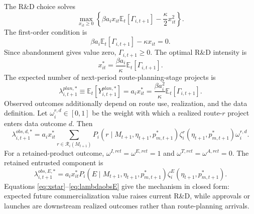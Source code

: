 \documentclass[12pt]{article}
\newcommand{\E}{\mathbb{E}}
\newcommand{\1}{\mathbf{1}}
\newcommand{\calR}{\mathcal{R}}
\begin{document}
The R\&D choice solves
\begin{equation}
\max_{x_{it}\ge0}\left\{
\beta a_i x_{it}\E_t[\Gamma_{i,t+1}]
-\frac{\kappa}{2}x_{it}^2
\right\}.
\label{eq:xproblem}
\end{equation}
The first-order condition is
\begin{equation}
    \beta a_i\E_t[\Gamma_{i,t+1}]-\kappa x_{it}=0.
    \label{eq:foc}
\end{equation}
Since abandonment gives value zero, $\Gamma_{i,t+1}\ge0$. The optimal R\&D intensity is
\begin{equation}
    x^*_{it}=\frac{\beta a_i}{\kappa}\E_t[\Gamma_{i,t+1}].
    \label{eq:xstar}
\end{equation}
The expected number of next-period route-planning-stage projects is
\begin{equation}
    \lambda^{plan,*}_{i,t+1}\equiv \E_t[Y^{plan,*}_{i,t+1}]
    =a_i x^*_{it}
    =\frac{\beta a_i^2}{\kappa}\E_t[\Gamma_{i,t+1}].
    \label{eq:lambdastar}
\end{equation}
Observed outcomes additionally depend on route use, realization, and the data definition. Let $\omega_i^{r,d}\in[0,1]$ be the weight with which a realized route-$r$ project enters data outcome $d$. Then
\begin{equation}
    \lambda^{obs,d,*}_{i,t+1}
    =
    a_i x^*_{it}
    \sum_{r\in\calR_i(M_{t+1})}
    P_i(r\mid M_{t+1},\eta_{t+1},p^*_{m,t+1})
    \zeta_i^r(\eta_{t+1},p^*_{m,t+1})\omega_i^{r,d}.
    \label{eq:lambdaobs}
\end{equation}
For a retained-product outcome, $\omega^{I,ret}=\omega^{E,ret}=1$ and $\omega^{T,ret}=\omega^{A,ret}=0$. The retained entrusted component is
\begin{equation}
    \lambda^{obs,E,*}_{i,t+1}
    =
    a_i x^*_{it}
    P_i(E\mid M_{t+1},\eta_{t+1},p^*_{m,t+1})
    \zeta_i^E(\eta_{t+1},p^*_{m,t+1}).
    \label{eq:lambdaobsE}
\end{equation}
Equations \eqref{eq:xstar}--\eqref{eq:lambdaobsE} give the mechanism in closed form: expected future commercialization value raises current R\&D, while approvals or launches are downstream realized outcomes rather than route-planning arrivals.
\end{document}
